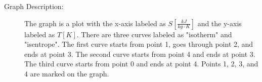 

\item[a)] 
    \begin{description}
        \item[Graph Description:] 
        The graph is a plot with the x-axis labeled as $S \left[ \frac{kJ}{kg \cdot K} \right]$ and the y-axis labeled as $T \left[ K \right]$. There are three curves labeled as "isotherm" and "isentrope". The first curve starts from point 1, goes through point 2, and ends at point 3. The second curve starts from point 4 and ends at point 3. The third curve starts from point 0 and ends at point 4. Points 1, 2, 3, and 4 are marked on the graph.
    \end{description}